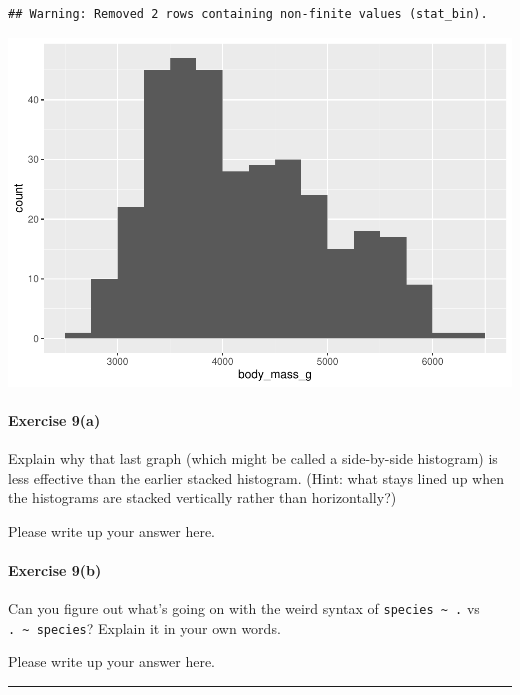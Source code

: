 \documentclass[
]{book}
\begin{document}
\begin{verbatim}
## Warning: Removed 2 rows containing non-finite values (stat_bin).
\end{verbatim}

\includegraphics{intro_stats_files/figure-latex/unnamed-chunk-108-1.pdf}

\hypertarget{exercise-9a-1}{%
\paragraph*{Exercise 9(a)}\label{exercise-9a-1}}

Explain why that last graph (which might be called a side-by-side histogram) is less effective than the earlier stacked histogram. (Hint: what stays lined up when the histograms are stacked vertically rather than horizontally?)

Please write up your answer here.

\hypertarget{exercise-9b-1}{%
\paragraph*{Exercise 9(b)}\label{exercise-9b-1}}

Can you figure out what's going on with the weird syntax of \texttt{species\ \textasciitilde{}\ .} vs \texttt{.\ \textasciitilde{}\ species}? Explain it in your own words.

Please write up your answer here.

\begin{center}\rule{0.5\linewidth}{0.5pt}\end{center}
\end{document}
